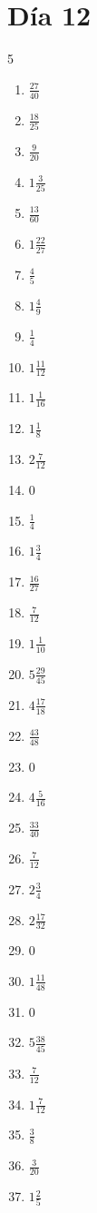 \documentclass[12pt]{article}
\begin{document}
\section*{Día 12}
\begin{multicols}{5}\begin{enumerate}
\item $ \frac{27}{40} $
\item $ \frac{18}{25} $
\item $ \frac{9}{20} $
\item $ 1 \frac{3}{25} $
\item $ \frac{13}{60} $
\item $ 1 \frac{22}{27} $
\item $ \frac{4}{5} $
\item $ 1 \frac{4}{9} $
\item $ \frac{1}{4} $
\item $ 1 \frac{11}{12} $
\item $ 1 \frac{1}{16} $
\item $ 1 \frac{1}{8} $
\item $ 2 \frac{7}{12} $
\item $ 0 $
\item $ \frac{1}{4} $
\item $ 1 \frac{3}{4} $
\item $ \frac{16}{27} $
\item $ \frac{7}{12} $
\item $ 1 \frac{1}{10} $
\item $ 5 \frac{29}{45} $
\item $ 4 \frac{17}{18} $
\item $ \frac{43}{48} $
\item $ 0 $
\item $ 4 \frac{5}{16} $
\item $ \frac{33}{40} $
\item $ \frac{7}{12} $
\item $ 2 \frac{3}{4} $
\item $ 2 \frac{17}{32} $
\item $ 0 $
\item $ 1 \frac{11}{48} $
\item $ 0 $
\item $ 5 \frac{38}{45} $
\item $ \frac{7}{12} $
\item $ 1 \frac{7}{12} $
\item $ \frac{3}{8} $
\item $ \frac{3}{20} $
\item $ 1 \frac{2}{5} $

\end{enumerate}
\end{multicols}
\end{document}

